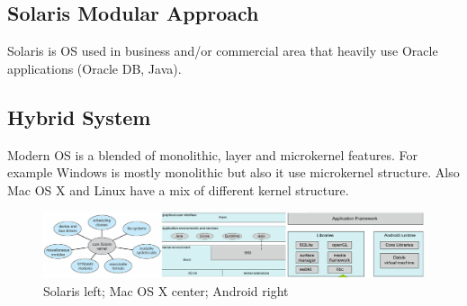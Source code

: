 \subsection{Solaris Modular Approach}
Solaris is OS used in business and/or commercial area that heavily use Oracle applications (Oracle DB, Java).

\subsection{Hybrid System}
Modern OS is a blended of monolithic, layer and microkernel features.
For example Windows is mostly monolithic but also it use microkernel structure. Also Mac OS X and Linux have a mix of different kernel structure.


\begin{figure}[htbp]
    \centering
    \includegraphics[width=1\linewidth]{img/kernel_3.png}
    \caption{Solaris left; Mac OS X center; Android right}
    
\end{figure}